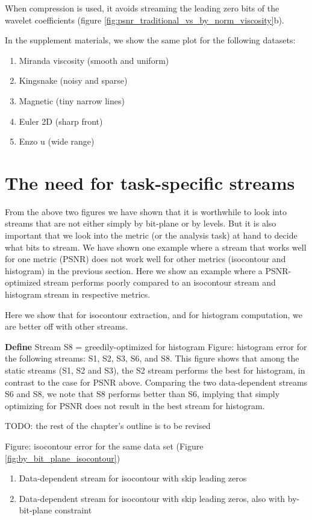 When compression is used, it avoids streaming the leading zero bits of the wavelet coefficients (figure \ref{fig:psnr_traditional_vs_by_norm_viscosity}b).

In the supplement materials, we show the same plot for the following datasets:
\begin{enumerate}
  \item Miranda viscosity (smooth and uniform)
  \item Kingsnake (noisy and sparse)
  \item Magnetic (tiny narrow lines)
  \item Euler 2D (sharp front)
  \item Enzo u (wide range)
\end{enumerate}

\section{The need for task-specific streams}
From the above two figures we have shown that it is worthwhile to look into streams that are not either simply by bit-plane or by levels. But it is also important that we look into the metric (or the analysis task) at hand to decide what bits to stream. We have shown one example where a stream that works well for one metric (PSNR) does not work well for other metrics (isocontour and histogram) in the previous section. Here we show an example where a PSNR-optimized stream performs poorly compared to an isocontour stream and histogram stream in respective metrics.

Here we show that for isocontour extraction, and for histogram computation, we are better off with other streams.

\textbf{Define} Stream S8 = greedily-optimized for histogram
Figure: histogram error for the following streams: S1, S2, S3, S6, and S8. This figure shows that among the static streams (S1, S2 and S3), the S2 stream performs the best for histogram, in contrast to the case for PSNR above. Comparing the two data-dependent streams S6 and S8, we note that S8 performs better than S6, implying that simply optimizing for PSNR does not result in the best stream for histogram.

TODO: the rest of the chapter's outline is to be revised

Figure: isocontour error for the same data set (Figure \ref{fig:by_bit_plane_isocontour})
\begin{enumerate}
  \item Data-dependent stream for isocontour with skip leading zeros
  \item Data-dependent stream for isocontour with skip leading zeros, also with by-bit-plane constraint
\end{enumerate}

